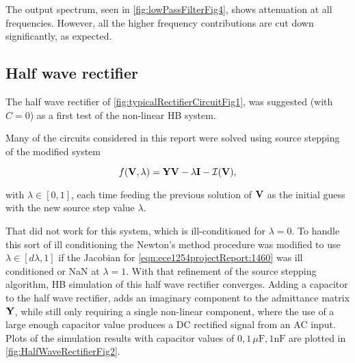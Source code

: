 The output spectrum, seen in \cref{fig:lowPassFilterFig4},
shows attenuation at all frequencies.
However, all the higher frequency contributions are cut down significantly, as expected.


\subsection{Half wave rectifier}

The half wave rectifier of \cref{fig:typicalRectifierCircuitFig1}, was suggested (with \( C = 0 \)) as a first test of the non-linear HB system.


Many of the circuits considered in this report were solved using source stepping of the modified system

\begin{equation}\label{eqn:ece1254projectReport:1460}
f(\BV, \lambda) = \BY \BV - \lambda \BI - \mathcal{I}(\BV),
\end{equation}

with \( \lambda \in [0, 1] \), each time feeding the previous solution of \( \mathbf{V} \) as the initial guess with the new source step value \( \lambda \).

That did not work for this system, which is ill-conditioned for \( \lambda = 0 \).
To handle this sort of ill conditioning the Newton's method procedure was modified to use \( \lambda \in [d\lambda, 1] \) if the Jacobian for \cref{eqn:ece1254projectReport:1460} was ill conditioned or NaN at \( \lambda = 1 \).
With that refinement of the source stepping algorithm, HB simulation of this half wave rectifier converges.
Adding a capacitor to the half wave rectifier, adds an imaginary component to the admittance matrix \( \mathbf{Y} \), while still only requiring a single non-linear component, where the use of a large enough capacitor value produces a DC rectified signal from an AC input.
Plots of the simulation results with
capacitor values of \( 0, 1 \, \mu \text{F}, 1 \text{nF} \) are plotted in \cref{fig:HalfWaveRectifierFig2}.

